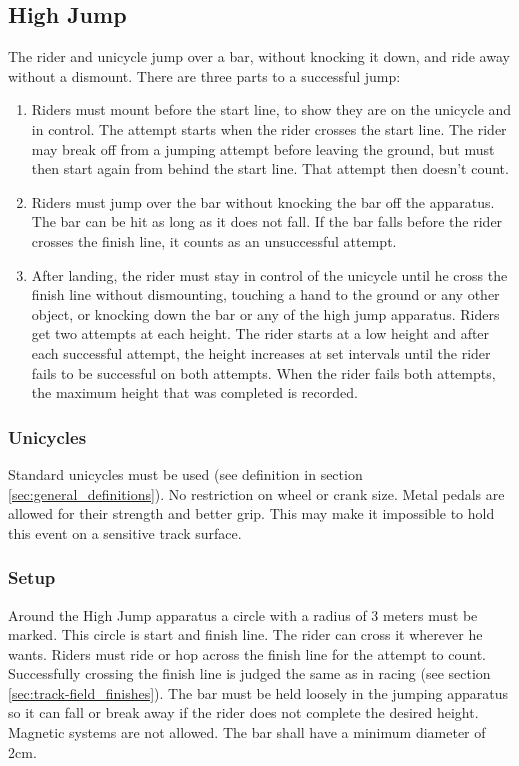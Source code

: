 \subsection{High Jump}
The rider and unicycle jump over a bar, without knocking it down, and ride away without a dismount.
There are three parts to a successful jump: 
\begin{enumerate}
\item Riders must mount before the start line, to show they are on the unicycle and in control.
The attempt starts when the rider crosses the start line.
The rider may break off from a jumping attempt before leaving the ground, but must then start again from behind the start line.
That attempt then doesn't count.
\item Riders must jump over the bar without knocking the bar off the apparatus.
The bar can be hit as long as it does not fall.
If the bar falls before the rider crosses the finish line, it counts as an unsuccessful attempt.
\item After landing, the rider must stay in control of the unicycle until he cross the finish line without dismounting, touching a hand to the ground or any other object, or knocking down the bar or any of the high jump apparatus.
Riders get two attempts at each height.
The rider starts at a low height and after each successful attempt, the height increases at set intervals until the rider fails to be successful on both attempts.
When the rider fails both attempts, the maximum height that was completed is recorded.
\end{enumerate}

\subsubsection{Unicycles}
Standard unicycles must be used (see definition in section \ref{sec:general_definitions}).
No restriction on wheel or crank size.
Metal pedals are allowed for their strength and better grip.
This may make it impossible to hold this event on a sensitive track surface.

\subsubsection{Setup}
Around the High Jump apparatus a circle with a radius of 3 meters must be marked.
This circle is start and finish line.
The rider can cross it wherever he wants.
Riders must ride or hop across the finish line for the attempt to count.
Successfully crossing the finish line is judged the same as in racing (see section \ref{sec:track-field_finishes}).
The bar must be held loosely in the jumping apparatus so it can fall or break away if the rider does not complete the desired height.
Magnetic systems are not allowed.
The bar shall have a minimum diameter of 2cm.

